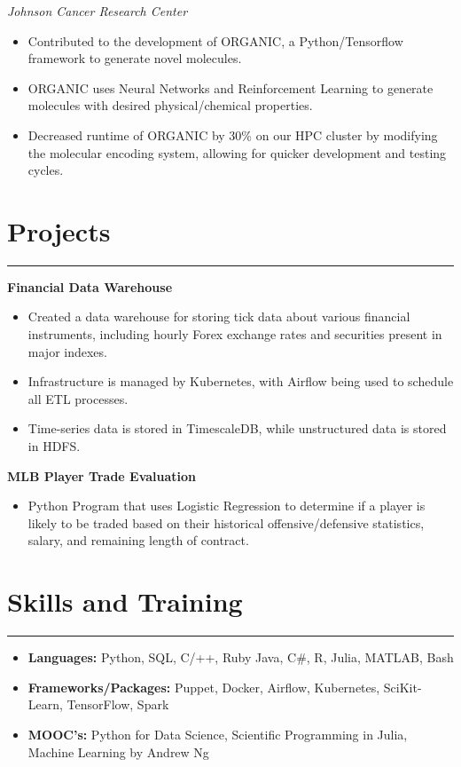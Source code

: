 \documentclass[11pt]{article}
\newcommand{\resumesection}[1]{\vspace{-0.2cm}\section*{#1}\vspace{-0.2cm}\hrule\vspace{0.2cm}}
\begin{document}
\textit{Johnson Cancer Research Center}
\begin{itemize}
	\item Contributed to the development of ORGANIC, a Python/Tensorflow framework to generate novel molecules. 
	\item ORGANIC uses Neural Networks and Reinforcement Learning to generate molecules with desired physical/chemical properties.
	\item Decreased runtime of ORGANIC by 30\% on our HPC cluster by modifying the molecular encoding system, allowing for quicker development and testing cycles.
\end{itemize}

\resumesection{Projects}
\textbf{Financial Data Warehouse}
\begin{itemize}
	\item Created a data warehouse for storing tick data about various financial instruments, including hourly Forex exchange rates and securities present in major indexes.
	\item Infrastructure is managed by Kubernetes, with Airflow being used to schedule all ETL processes.
	\item Time-series data is stored in TimescaleDB, while unstructured data is stored in HDFS.
\end{itemize}

\textbf{MLB Player Trade Evaluation}
\begin{itemize}
	\item Python Program that uses Logistic Regression to determine if a player is likely to be traded based on their historical offensive/defensive statistics, salary, and remaining length of contract.
\end{itemize}




\resumesection{Skills and Training}
\begin{itemize}
	\item \textbf{Languages:} Python, SQL, C/++, Ruby Java, C\#, R, Julia, MATLAB, Bash
	\item \textbf{Frameworks/Packages:} Puppet, Docker, Airflow, Kubernetes, SciKit-Learn, TensorFlow, Spark
	\item \textbf{MOOC's:} Python for Data Science, Scientific Programming in Julia, Machine Learning by Andrew Ng
\end{itemize}
\end{document}
